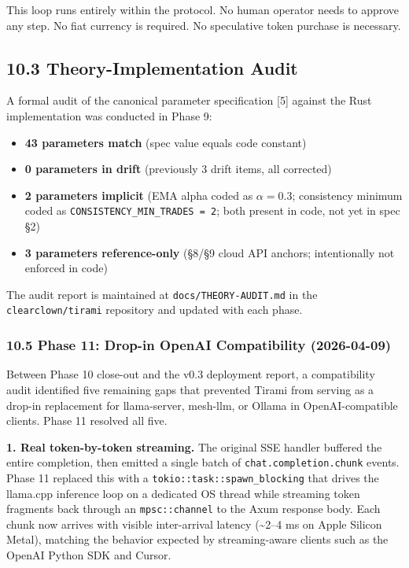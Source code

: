 \documentclass[
  11pt,
]{article}
\providecommand{\tightlist}{%
  \setlength{\itemsep}{0pt}\setlength{\parskip}{0pt}}
\begin{document}
This loop runs entirely within the protocol. No human operator needs to
approve any step. No fiat currency is required. No speculative token
purchase is necessary.

\subsection{10.3 Theory-Implementation
Audit}\label{theory-implementation-audit}

A formal audit of the canonical parameter specification {[}5{]} against
the Rust implementation was conducted in Phase 9:

\begin{itemize}
\tightlist
\item
  \textbf{43 parameters match} (spec value equals code constant)
\item
  \textbf{0 parameters in drift} (previously 3 drift items, all
  corrected)
\item
  \textbf{2 parameters implicit} (EMA alpha coded as \(\alpha = 0.3\);
  consistency minimum coded as \texttt{CONSISTENCY\_MIN\_TRADES\ =\ 2};
  both present in code, not yet in spec §2)
\item
  \textbf{3 parameters reference-only} (§8/§9 cloud API anchors;
  intentionally not enforced in code)
\end{itemize}

The audit report is maintained at \texttt{docs/THEORY-AUDIT.md} in the
\texttt{clearclown/tirami} repository and updated with each phase.

\subsubsection{10.5 Phase 11: Drop-in OpenAI Compatibility
(2026-04-09)}\label{phase-11-drop-in-openai-compatibility-2026-04-09}

Between Phase 10 close-out and the v0.3 deployment report, a
compatibility audit identified five remaining gaps that prevented Tirami
from serving as a drop-in replacement for llama-server, mesh-llm, or
Ollama in OpenAI-compatible clients. Phase 11 resolved all five.

\textbf{1. Real token-by-token streaming.} The original SSE handler
buffered the entire completion, then emitted a single batch of
\texttt{chat.completion.chunk} events. Phase 11 replaced this with a
\texttt{tokio::task::spawn\_blocking} that drives the llama.cpp
inference loop on a dedicated OS thread while streaming token fragments
back through an \texttt{mpsc::channel} to the Axum response body. Each
chunk now arrives with visible inter-arrival latency
(\textasciitilde2--4 ms on Apple Silicon Metal), matching the behavior
expected by streaming-aware clients such as the OpenAI Python SDK and
Cursor.
\end{document}
